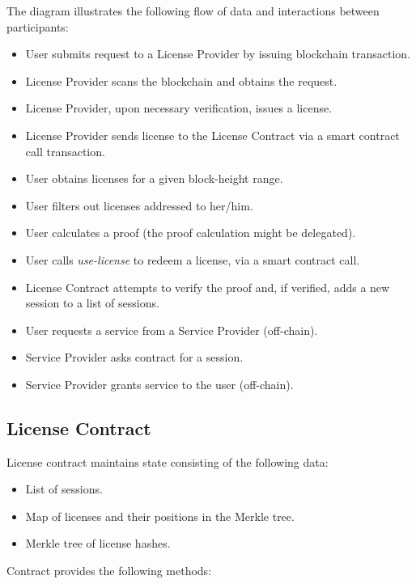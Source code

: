The diagram illustrates the following flow of data and interactions between participants:

\begin{itemize}%
	\item User submits request to a License Provider by issuing blockchain transaction.
	\item License Provider scans the blockchain and obtains the request.
	\item License Provider, upon necessary verification, issues a license.
	\item License Provider sends license to the License Contract via a smart contract call transaction.
	\item User obtains licenses for a given block-height range.
	\item User filters out licenses addressed to her/him.
	\item User calculates a proof (the proof calculation might be delegated).
	\item User calls \textit{use-license} to redeem a license, via a smart contract call.
	\item License Contract attempts to verify the proof and, if verified, adds a new session to a list of sessions.
	\item User requests a service from a Service Provider (off-chain).
	\item Service Provider asks contract for a session.
	\item Service Provider grants service to the user (off-chain).
\end{itemize}


\subsection{License Contract}

\begin{flushleft}
License contract maintains state consisting of the following data:
\end{flushleft}

\begin{itemize}%
	\item List of sessions.
	\item Map of licenses and their positions in the Merkle tree.
	\item Merkle tree of license hashes.
\end{itemize}


\begin{flushleft}
Contract provides the following methods:
\end{flushleft}

